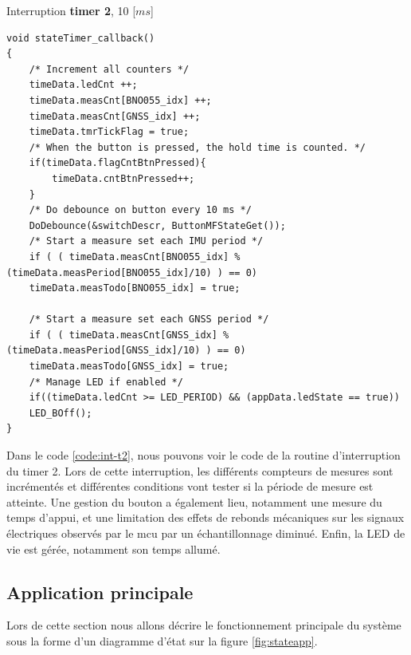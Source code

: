 \begin{code}
\caption{Interruption \textbf{timer 2}, 10 [$ms$]}
\label{code:int-t2}
\begin{verbatim}
void stateTimer_callback()
{
	/* Increment all counters */
	timeData.ledCnt ++;
	timeData.measCnt[BNO055_idx] ++;
	timeData.measCnt[GNSS_idx] ++;
	timeData.tmrTickFlag = true;
	/* When the button is pressed, the hold time is counted. */
	if(timeData.flagCntBtnPressed){
		timeData.cntBtnPressed++;
	}
	/* Do debounce on button every 10 ms */
	DoDebounce(&switchDescr, ButtonMFStateGet());
	/* Start a measure set each IMU period */        
	if ( ( timeData.measCnt[BNO055_idx] % (timeData.measPeriod[BNO055_idx]/10) ) == 0)
	timeData.measTodo[BNO055_idx] = true;
	
	/* Start a measure set each GNSS period */        
	if ( ( timeData.measCnt[GNSS_idx] % (timeData.measPeriod[GNSS_idx]/10) ) == 0)
	timeData.measTodo[GNSS_idx] = true;
	/* Manage LED if enabled */
	if((timeData.ledCnt >= LED_PERIOD) && (appData.ledState == true))
	LED_BOff();
} 
\end{verbatim}
\end{code}	

Dans le code \ref{code:int-t2}, nous pouvons voir le code de la routine d'interruption du timer 2. Lors de cette interruption, les différents compteurs de mesures sont incrémentés et différentes conditions vont tester si la période de mesure est atteinte. Une gestion du bouton a également lieu, notamment une mesure du temps d'appui, et une limitation des effets de rebonds mécaniques sur les signaux électriques observés par le \gls{mcu} par un échantillonnage diminué. Enfin, la LED de vie est gérée, notamment son temps allumé.


\clearpage

\subsection{Application principale} 

Lors de cette section nous allons décrire le fonctionnement principale du système sous la forme d'un diagramme d'état sur la figure \ref{fig:stateapp}.


